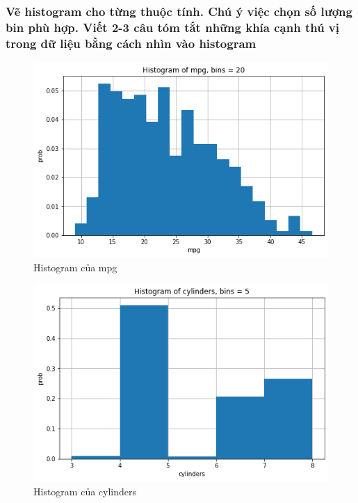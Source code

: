 \documentclass[a4paper, 12pt]{article}
\begin{document}
    \subsubsection{Vẽ histogram cho từng thuộc tính. Chú ý việc chọn số lượng bin phù hợp. Viết 2-3 câu tóm tắt những khía cạnh thú vị trong dữ liệu bằng cách nhìn vào histogram}
        \begin{figure}[H]
            \centering
                \includegraphics[scale=0.9]{img/mpg.png}
                \caption{Histogram của mpg}
        \end{figure}
        
        \begin{figure}[H]
            \centering
                \includegraphics[scale=0.9]{img/cylinders.png}
                \caption{Histogram của cylinders}
        \end{figure}
        
\end{document}
